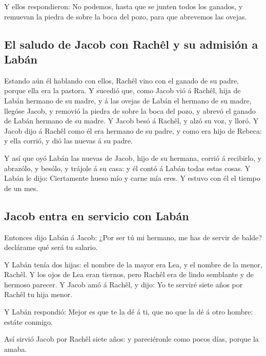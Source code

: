  Y ellos respondieron: No podemos, hasta que se junten
todos los ganados, y remuevan la piedra de sobre la boca del pozo, para
que abrevemos las ovejas.

\hypertarget{el-saludo-de-jacob-con-rachuxeal-y-su-admisiuxf3n-a-labuxe1n}{%
\subsection{El saludo de Jacob con Rachêl y su admisión a
Labán}\label{el-saludo-de-jacob-con-rachuxeal-y-su-admisiuxf3n-a-labuxe1n}}

 Estando aún él hablando con ellos, Rachêl vino con el
ganado de su padre, porque ella era la pastora.  Y
sucedió que, como Jacob vió á Rachêl, hija de Labán hermano de su madre,
y á las ovejas de Labán el hermano de su madre, llegóse Jacob, y removió
la piedra de sobre la boca del pozo, y abrevó el ganado de Labán hermano
de su madre.  Y Jacob besó á Rachêl, y alzó su voz, y
lloró.  Y Jacob dijo á Rachêl como él era hermano de su
padre, y como era hijo de Rebeca: y ella corrió, y dió las nuevas á su
padre.

 Y así que oyó Labán las nuevas de Jacob, hijo de su
hermana, corrió á recibirlo, y abrazólo, y besólo, y trájole á su casa:
y él contó á Labán todas estas cosas.  Y Labán le dijo:
Ciertamente hueso mío y carne mía eres. Y estuvo con él el tiempo de un
mes.

\hypertarget{jacob-entra-en-servicio-con-labuxe1n}{%
\subsection{Jacob entra en servicio con
Labán}\label{jacob-entra-en-servicio-con-labuxe1n}}

 Entonces dijo Labán á Jacob: ¿Por ser tú mi hermano, me
has de servir de balde? declárame qué será tu salario.

 Y Labán tenía dos hijas: el nombre de la mayor era Lea,
y el nombre de la menor, Rachêl.  Y los ojos de Lea eran
tiernos, pero Rachêl era de lindo semblante y de hermoso parecer.
 Y Jacob amó á Rachêl, y dijo: Yo te serviré siete años
por Rachêl tu hija menor.

 Y Labán respondió: Mejor es que te la dé á ti, que no
que la dé á otro hombre: estáte conmigo.

 Así sirvió Jacob por Rachêl siete años: y pareciéronle
como pocos días, porque la amaba.

